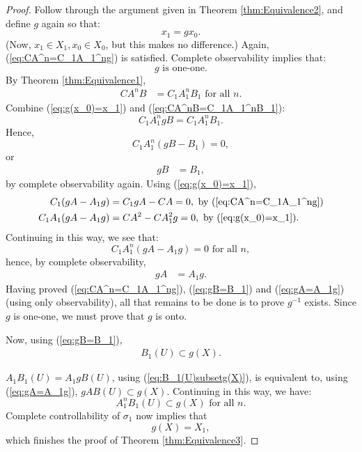 \documentclass[12pt]{book}
\theoremstyle{plain}
\theoremstyle{definition}
\begin{document}
\begin{proof}
    Follow through the argument given in Theorem \ref{thm:Equivalence2}, and define $g$ again so that:
    $$x_1 = gx_0.$$
    (Now, $x_1 \in X_1, x_0 \in X_0$, but this makes no difference.)
    Again, (\ref{eq:CA^n=C_1A_1^ng}) is satisfied.
    Complete observability implies that:
    $$g \text{ is one-one}.$$
    By Theorem \ref{thm:Equivalence1},
    \begin{align} \label{eq:CA^nB=C_1A_1^nB_1}
        CA^nB &= C_1A_1^nB_1 \text{ for all } n.
    \end{align}
    Combine (\ref{eq:g(x_0)=x_1}) and (\ref{eq:CA^nB=C_1A_1^nB_1}):
    $$C_1A_1^ngB = C_1A_1^nB_1.$$
    Hence,
    $$C_1A_1^n(gB-B_1) = 0,$$
    or
    \begin{align} \label{eq:gB=B_1}
        gB &= B_1,
    \end{align}
    by complete observability again.
    Using (\ref{eq:g(x_0)=x_1}),
    \begin{align*}
    \begin{split}
        C_1(gA - A_1g) &= C_1gA - CA = 0, \text{ by } (\ref{eq:CA^n=C_1A_1^ng}) \\
        C_1A_1(gA - A_1g) &= CA^2 - CA_1^2g = 0, \text{ by } (\ref{eq:g(x_0)=x_1}).
    \end{split}
    \end{align*}
    Continuing in this way, we see that:
    $$C_1A_1^n(gA - A_1g) = 0 \text{ for all } n,$$
    hence, by complete observability,
    \begin{align} \label{eq:gA=A_1g}
        gA &= A_1g.
    \end{align}
    Having proved (\ref{eq:CA^n=C_1A_1^ng}), (\ref{eq:gB=B_1}) and (\ref{eq:gA=A_1g}) (using only observability), all that remains to be done is to prove $g^{-1}$ exists.
    Since $g$ is one-one, we must prove that $g$ is onto.
    
    Now, using (\ref{eq:gB=B_1}),
    \begin{align} \label{eq:B_1(U)subsetg(X)}
        B_1(U) \subset g(X).
    \end{align}
    
    $A_1B_1(U) = A_1gB(U)$, using (\ref{eq:B_1(U)subsetg(X)}), is equivalent to, using (\ref{eq:gA=A_1g}), $gAB(U) \subset g(X)$.
    Continuing in this way, we have:
    $$A_1^nB_1(U) \subset g(X) \text{ for all } n.$$
    Complete controllability of $\sigma_1$ now implies that
    $$g(X) = X_1,$$
    which finishes the proof of Theorem \ref{thm:Equivalence3}.
\end{proof}
\end{document}
